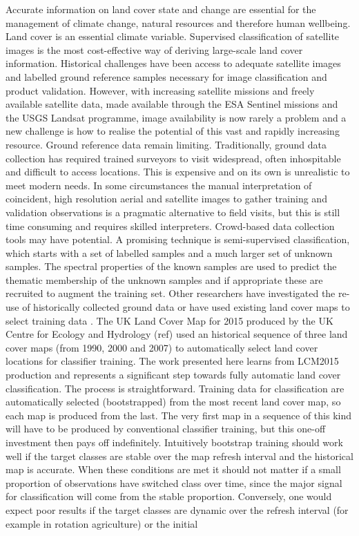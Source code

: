 Accurate information on land cover state and change are essential for the management of climate change, natural resources and therefore human wellbeing\cite{alcock2015accounts,burkhard2009landscapes,koschke2012multi}. Land cover is an essential climate variable\cite{bojinski2014concept,vargo2013importance}. Supervised classification of satellite images is the most cost-effective way of deriving large-scale land cover information.  Historical challenges have been access to adequate satellite images and labelled ground reference samples necessary for image classification and product validation.  However, with increasing satellite missions and freely available satellite data, made available through the ESA Sentinel missions and the USGS Landsat programme, image availability is now rarely a problem and a new challenge is how to realise the potential of this vast and rapidly increasing resource.  Ground reference data remain limiting.  Traditionally, ground data collection has required trained surveyors to visit widespread, often inhospitable and difficult to access locations.  This is expensive and on its own is unrealistic to meet modern needs.  In some circumstances the manual interpretation of coincident, high resolution aerial and satellite images to gather training and validation observations is a pragmatic alternative to field visits, but this is still time consuming and requires skilled interpreters.  Crowd-based data collection tools may have potential\cite{laso2016crowdsourcing,comber2013using}.  A promising technique is semi-supervised classification\cite{maulik2011self,liu2013self}, which starts with a set of labelled samples and a much larger set of unknown samples.  The spectral properties of the known samples are used to predict the thematic membership of the unknown samples and if appropriate these are recruited to augment the training set.  Other researchers have investigated the re-use of historically collected ground data \cite{inglada2017operational,tardy2017fusion} or have used existing land cover maps to select training data \cite{kim2017self}. The UK Land Cover Map for 2015 produced by the UK Centre for Ecology and Hydrology (ref) used an historical sequence of three land cover maps (from 1990, 2000 and 2007) to automatically select land cover locations for classifier training.  The work presented here learns from LCM2015 production and represents a significant step towards fully automatic land cover classification.  The process is straightforward.  Training data for classification are automatically selected (bootstrapped) from the most recent land cover map, so each map is produced from the last.  The very first map in a sequence of this kind will have to be produced by conventional classifier training, but this one-off investment then pays off indefinitely.  Intuitively bootstrap training should work well if the target classes are stable over the map refresh interval and the historical map is accurate.  When these conditions are met it should not matter if a small proportion of observations have switched class over time, since the major signal for classification will come from the stable proportion. Conversely, one would expect poor results if the target classes are dynamic over the refresh interval (for example in rotation agriculture) or the initial 